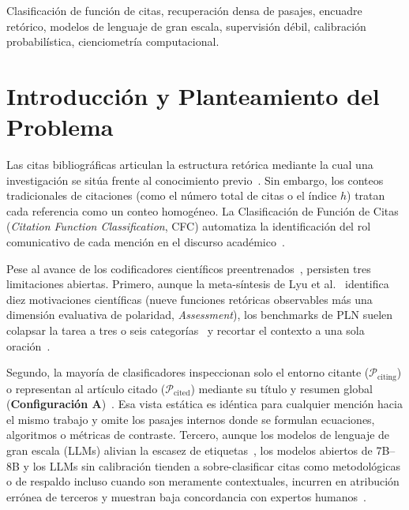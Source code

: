 \documentclass[conference]{IEEEtran}
\begin{document}
\begin{IEEEkeywords}
Clasificación de función de citas, recuperación densa de pasajes, encuadre retórico, modelos de lenguaje de gran escala, supervisión débil, calibración probabilística, cienciometría computacional.
\end{IEEEkeywords}

\section{Introducción y Planteamiento del Problema}

Las citas bibliográficas articulan la estructura retórica mediante la cual una investigación se sitúa frente al conocimiento previo~\cite{moravcsik1975some,lyu2021classification}. Sin embargo, los conteos tradicionales de citaciones (como el número total de citas o el índice $h$) tratan cada referencia como un conteo homogéneo. La Clasificación de Función de Citas (\textit{Citation Function Classification}, CFC) automatiza la identificación del rol comunicativo de cada mención en el discurso académico~\cite{teufel2006automatic,jurgens2018measuring}.

Pese al avance de los codificadores científicos preentrenados~\cite{beltagy2019scibert,cohan2019structural,paolini2025citefusion}, persisten tres limitaciones abiertas. Primero, aunque la meta-síntesis de Lyu et al.~\cite{lyu2021classification} identifica diez motivaciones científicas (nueve funciones retóricas observables más una dimensión evaluativa de polaridad, \textit{Assessment}), los benchmarks de PLN suelen colapsar la tarea a tres o seis categorías~\cite{cohan2019structural,jurgens2018measuring,pride2020authoritative} y recortar el contexto a una sola oración~\cite{lauscher2022multicite}.

Segundo, la mayoría de clasificadores inspeccionan solo el entorno citante ($\mathcal{P}_{\text{citing}}$) o representan al artículo citado ($\mathcal{P}_{\text{cited}}$) mediante su título y resumen global (\textbf{Configuración A})~\cite{gu2022local,singh2023scirepeval}. Esa vista estática es idéntica para cualquier mención hacia el mismo trabajo y omite los pasajes internos donde se formulan ecuaciones, algoritmos o métricas de contraste. Tercero, aunque los modelos de lenguaje de gran escala (LLMs) alivian la escasez de etiquetas~\cite{ding2023gpt3}, los modelos abiertos de 7B--8B y los LLMs sin calibración tienden a sobre-clasificar citas como metodológicas o de respaldo incluso cuando son meramente contextuales, incurren en atribución errónea de terceros y muestran baja concordancia con expertos humanos~\cite{fogelson2025llms}.
\end{document}
